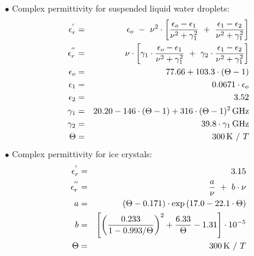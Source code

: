 {\noindent$\bullet$ Complex permittivity for suspended liquid water droplets:
\begin{eqnarray}
  \label{eq:comp_perm_lwc}
  \ree       & = & \epsilon_o~-~\nu^2\cdot
                   \left[\frac{\epsilon_o-\epsilon_1}{\nu^2+\gamma_1^2}~+~
                   \frac{\epsilon_1-\epsilon_2}{\nu^2+\gamma_1^2}\right]\nonumber\\
%
  \ime       & = & \nu\cdot\left[\gamma_1\cdot
                   \frac{\epsilon_o-\epsilon_1}{\nu^2+\gamma_1^2}~+~
                   \gamma_2\cdot\frac{\epsilon_1-\epsilon_2}{\nu^2+\gamma_1^2}\right]\nonumber\\
%
  \label{eq:comp_perm_lwc_epsilon_0}
  \epsilon_o & = & 77.66 + 103.3\cdot(\Theta-1)\\
  \epsilon_1 & = & 0.0671\cdot\epsilon_o\nonumber\\
  \epsilon_2 & = & 3.52\nonumber\\
%
  \label{eq:comp_perm_lwc_gamma_1}
  \gamma_1   & = & 20.20 - 146\cdot(\Theta-1) + 316\cdot(\Theta-1)^2\,\mbox{GHz}\\
  \gamma_2   & = & 39.8\cdot\gamma_1\,\mbox{GHz}\nonumber\\
%
  \Theta     & = & 300\,\mbox{K}~/~T\nonumber
%
\end{eqnarray}
$\bullet$ Complex permittivity for ice crystals:
\begin{eqnarray}
  \label{eq:comp_perm_iwc}
  \ree    & = & 3.15\nonumber\\
%
  \ime    & = & \frac{a}{\nu}~+~b\cdot\nu\nonumber\\
%
  \label{eq:comp_perm_iwc_a}
  a       & = & (\Theta-0.171)\cdot\exp{(17.0-22.1\cdot\Theta)}\\
  \label{eq:comp_perm_iwc_b}
  b       & = & \left[\left(\frac{0.233}{1-0.993/\Theta}\right)^2 + 
                \frac{6.33}{\Theta} - 1.31\right]\cdot10^{-5}\\
%
  \Theta  & = & 300\,\mbox{K}~/~T\nonumber
%

\end{eqnarray}}
